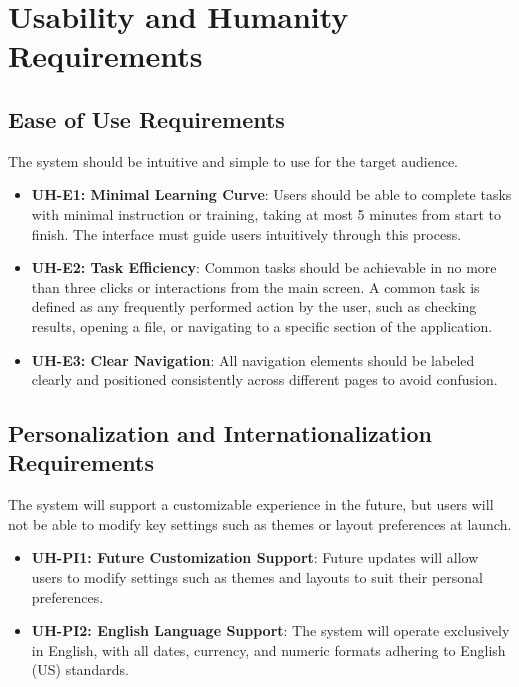 \documentclass[12pt]{article}
\begin{document}
\section{Usability and Humanity Requirements}

\subsection{Ease of Use Requirements}
The system should be intuitive and simple to use for the target audience.
\begin{itemize}
    \item \textbf{UH-E1: Minimal Learning Curve}: Users should be able to complete tasks 
    with minimal instruction or training, taking at most 5 minutes from start 
    to finish. The interface must guide users intuitively through this process.
    
    \item \textbf{UH-E2: Task Efficiency}: Common tasks should be achievable in no more 
    than three clicks or interactions from the main screen. A common task is defined as 
    any frequently performed action by the user, such as checking results, opening a file, 
    or navigating to a specific section of the application.
    
    \item \textbf{UH-E3: Clear Navigation}: All navigation elements should be labeled 
    clearly and positioned consistently across different pages to avoid confusion.
\end{itemize}

\subsection{Personalization and Internationalization Requirements}
The system will support a customizable experience in the future, but users will 
not be able to modify key settings such as themes or layout preferences at launch.
\begin{itemize}
    \item \textbf{UH-PI1: Future Customization Support}: Future updates will allow users 
    to modify settings such as themes and layouts to suit their personal preferences.
    
    \item \textbf{UH-PI2: English Language Support}: The system will operate exclusively 
    in English, with all dates, currency, and numeric formats adhering to 
    English (US) standards.
\end{itemize}
\end{document}
